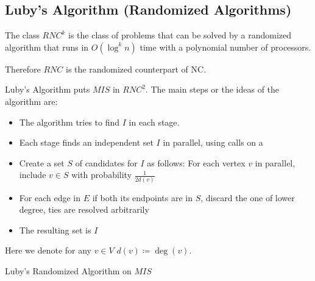 \subsection{Luby's Algorithm (Randomized Algorithms)}
\begin{definition}[$RNC^{k}$]
	The class $RNC^{k}$ is the class of problems that can be solved by a randomized algorithm that runs in $O(\log^k n)$ time with a polynomial number of processors. 
\end{definition}
\begin{remark}
	Therefore $RNC$ is the randomized counterpart of NC.\parinn
\end{remark}
Luby's Algorithm puts $MIS$ in $RNC^2$. The main steps or the ideas of the algorithm are:\begin{itemize}
	\item The algorithm tries to find $I$ in each stage.
	\item Each stage finds an independent set $I$ in parallel, using calls on a 
	\item Create a set $S$ of candidates for $I$ as follows: For each vertex $v$ in parallel, include $v\in S$ with probability $\frac1{2d(v)}$
	\item For each edge in $E$ if both its endpoints are in $S$, discard the one of lower degree, ties are resolved arbitrarily
	\item The resulting set is $I$
\end{itemize}
Here we denote for any $v\in V$ $d(v)\coloneqq \deg(v)$. 
\begin{algorithm}
	\DontPrintSemicolon
	\caption{Luby's Randomized Algorithm on $MIS$\label{lubymis}}
\end{algorithm}

